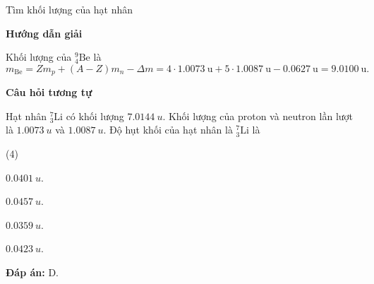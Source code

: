 \begin{dang}{Tìm khối lượng của hạt nhân}
	
	
	{\begin{center}
			\textbf{Hướng dẫn giải}
		\end{center}
		
		Khối lượng của $^9_4\text{Be}$ là
		\begin{equation*}
			m_\text{Be}= Z m_p+ (A-Z) m_n - \Delta m = 4\cdot \SI{1,0073}{\atomicmassunit} + 5 \cdot \SI{1,0087}{\atomicmassunit} - \SI{0,0627}{\atomicmassunit} = \SI{9,0100}{\atomicmassunit}.
		\end{equation*}
		
		\begin{center}
			\textbf{Câu hỏi tương tự}
		\end{center}
		
		Hạt nhân $ ^7_{3} \text{Li} $ có khối lượng $ \SI{7,0144}{u} $. Khối lượng của proton và neutron lần lượt là $ \SI{1,0073}{u} $ và $ \SI{1,0087}{u} $. Độ hụt khối của hạt nhân là $ ^7_{3} \text{Li} $ là
		\begin{mcq}(4)
			\item $ \SI{0,0401}{u} $.
			\item $ \SI{0,0457}{u} $.
			\item $ \SI{0,0359}{u} $.
			\item $ \SI{0,0423}{u} $.
		\end{mcq}
		\textbf{Đáp án:} D.}
	
\end{dang}

